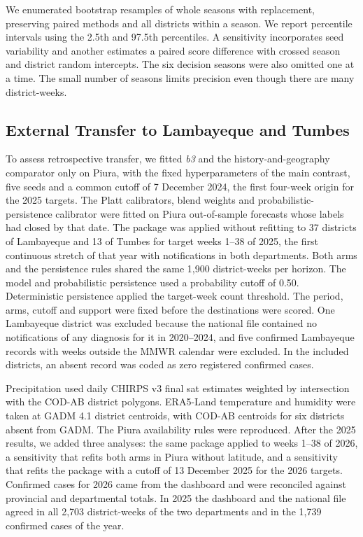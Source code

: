 \documentclass[journal]{IEEEtran}
\newcommand{\bthree}{\textit{b3}}
\begin{document}
We enumerated bootstrap resamples of whole seasons with replacement, preserving paired methods and all districts within a season. We report percentile intervals using the 2.5th and 97.5th percentiles. A sensitivity incorporates seed variability and another estimates a paired score difference with crossed season and district random intercepts. The six decision seasons were also omitted one at a time. The small number of seasons limits precision even though there are many district-weeks.

\subsection{External Transfer to Lambayeque and Tumbes}
To assess retrospective transfer, we fitted \bthree{} and the history-and-geography comparator only on Piura, with the fixed hyperparameters of the main contrast, five seeds and a common cutoff of 7 December 2024, the first four-week origin for the 2025 targets. The Platt calibrators, blend weights and probabilistic-persistence calibrator were fitted on Piura out-of-sample forecasts whose labels had closed by that date. The package was applied without refitting to 37 districts of Lambayeque and 13 of Tumbes for target weeks 1--38 of 2025, the first continuous stretch of that year with notifications in both departments. Both arms and the persistence rules shared the same 1,900 district-weeks per horizon. The model and probabilistic persistence used a probability cutoff of 0.50. Deterministic persistence applied the target-week count threshold. The period, arms, cutoff and support were fixed before the destinations were scored. One Lambayeque district was excluded because the national file contained no notifications of any diagnosis for it in 2020--2024, and five confirmed Lambayeque records with weeks outside the MMWR calendar were excluded. In the included districts, an absent record was coded as zero registered confirmed cases.

Precipitation used daily CHIRPS v3 final sat estimates weighted by intersection with the COD-AB district polygons. ERA5-Land temperature and humidity were taken at GADM 4.1 district centroids, with COD-AB centroids for six districts absent from GADM. The Piura availability rules were reproduced. After the 2025 results, we added three analyses: the same package applied to weeks 1--38 of 2026, a sensitivity that refits both arms in Piura without latitude, and a sensitivity that refits the package with a cutoff of 13 December 2025 for the 2026 targets. Confirmed cases for 2026 came from the dashboard and were reconciled against provincial and departmental totals. In 2025 the dashboard and the national file agreed in all 2,703 district-weeks of the two departments and in the 1,739 confirmed cases of the year.
\end{document}
